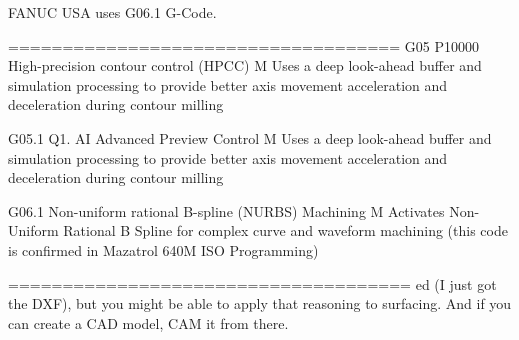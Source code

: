 FANUC USA uses G06.1 G-Code.

====================================
G05 P10000 	High-precision contour control (HPCC) 	M 	  	Uses a deep look-ahead buffer and simulation processing to provide better axis movement acceleration and deceleration during contour milling

G05.1 Q1. 	AI Advanced Preview Control 	M 	  	Uses a deep look-ahead buffer and simulation processing to provide better axis movement acceleration and deceleration during contour milling

G06.1 	Non-uniform rational B-spline (NURBS) Machining 	M 	  	Activates Non-Uniform Rational B Spline for complex curve and waveform machining (this code is confirmed in Mazatrol 640M ISO Programming) 

=====================================
ed (I just got the DXF), but you might be able to apply that reasoning to surfacing. And if you can create a CAD model, CAM it from there. 


